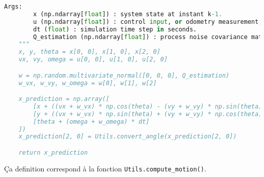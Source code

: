 \documentclass[../CSC_5RO12_TA_TP3.tex]{subfiles}
\begin{document}
\begin{definition}
\begin{scriptsize}
\begin{lstlisting}[language=Python, caption=\texttt{motion\_model\_prediction()}]
    Args:
        x (np.ndarray[float]) : system state at instant k-1.
        u (np.ndarray[float]) : control input, or odometry measurement, at instant k.
        dt (float) : simulation time step in seconds.
        Q_estimation (np.ndarray[float]) : process noise covariance matrix Q estimation.
    """
    x, y, theta = x[0, 0], x[1, 0], x[2, 0]
    vx, vy, omega = u[0, 0], u[1, 0], u[2, 0]

    w = np.random.multivariate_normal([0, 0, 0], Q_estimation)
    w_vx, w_vy, w_omega = w[0], w[1], w[2]

    x_prediction = np.array([
        [x + ((vx + w_vx) * np.cos(theta) - (vy + w_vy) * np.sin(theta)) * dt],
        [y + ((vx + w_vx) * np.sin(theta) + (vy + w_vy) * np.cos(theta)) * dt],
        [theta + (omega + w_omega) * dt]
    ])
    x_prediction[2, 0] = Utils.convert_angle(x_prediction[2, 0])

    return x_prediction
        \end{lstlisting}
    \end{scriptsize}
    \begin{remark}
        Ça definition correspond à la fonction \texttt{Utils.compute\_motion()}.
    \end{remark}
\end{definition}
\end{document}
